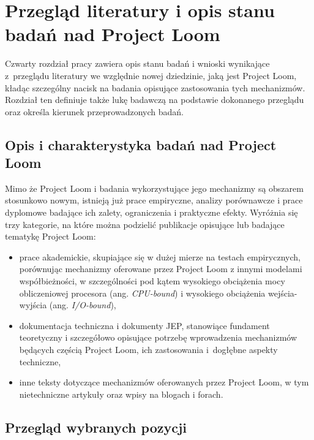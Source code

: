\chapter{Przegląd literatury i opis stanu badań nad Project Loom}
Czwarty rozdział pracy zawiera opis stanu badań i wnioski wynikające z~przeglądu literatury we względnie nowej dziedzinie, jaką jest Project Loom, kładąc szczególny nacisk na badania opisujące zastosowania tych mechanizmów. Rozdział ten definiuje także lukę badawczą na podstawie dokonanego przeglądu oraz określa kierunek przeprowadzonych badań.

\section{Opis i charakterystyka badań nad Project Loom}
Mimo że Project Loom i badania wykorzystujące jego mechanizmy są obszarem stosunkowo nowym, istnieją już prace empiryczne, analizy porównawcze i prace dyplomowe badające ich zalety, ograniczenia i praktyczne efekty.
Wyróżnia się trzy kategorie, na które można podzielić publikacje opisujące lub badające tematykę Project Loom:
\begin{itemize}
    \itemsep0em
    \item prace akademickie, skupiające się w dużej mierze na testach empirycznych, porównując mechanizmy oferowane przez Project Loom z innymi modelami współbieżności, w szczególności pod kątem wysokiego obciążenia mocy obliczeniowej procesora (ang. \emph{CPU-bound}) i wysokiego obciążenia wejścia-wyjścia (ang. \emph{I/O-bound}),
    \item dokumentacja techniczna i dokumenty JEP, stanowiące fundament teoretyczny i szczegółowo opisujące potrzebę wprowadzenia mechanizmów będących częścią Project Loom, ich zastosowania i~dogłębne aspekty techniczne,
    \item inne teksty dotyczące mechanizmów oferowanych przez Project Loom, w tym nietechniczne artykuły oraz wpisy na blogach i forach.
\end{itemize}

\section{Przegląd wybranych pozycji}


